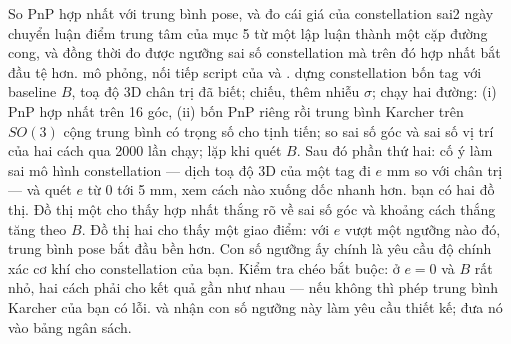 \documentclass[../../marker.tex]{subfiles}
\begin{document}
\begin{duan}{So PnP hợp nhất với trung bình pose, và đo cái giá của constellation sai}{2 ngày}
\dmt chuyển luận điểm trung tâm của mục 5 từ một lập luận thành một cặp đường cong, và đồng thời đo được ngưỡng sai số constellation mà trên đó hợp nhất bắt đầu tệ hơn.
\ddl mô phỏng, nối tiếp script của  và .
\dbc dựng constellation bốn tag với baseline \(B\), toạ độ 3D chân trị đã biết; chiếu, thêm nhiễu \(\sigma\); chạy hai đường: (i) PnP hợp nhất trên 16 góc, (ii) bốn PnP riêng rồi trung bình Karcher trên \(SO(3)\) cộng trung bình có trọng số cho tịnh tiến; so sai số góc và sai số vị trí của hai cách qua 2000 lần chạy; lặp khi quét \(B\). Sau đó phần thứ hai: cố ý làm sai mô hình constellation --- dịch toạ độ 3D của một tag đi \(e\) mm so với chân trị --- và quét \(e\) từ 0 tới 5 mm, xem cách nào xuống dốc nhanh hơn.
\dxk bạn có hai đồ thị. Đồ thị một cho thấy hợp nhất thắng rõ về sai số góc và khoảng cách thắng tăng theo \(B\). Đồ thị hai cho thấy một giao điểm: với \(e\) vượt một ngưỡng nào đó, trung bình pose bắt đầu bền hơn. Con số ngưỡng ấy chính là yêu cầu độ chính xác cơ khí cho constellation của bạn. Kiểm tra chéo bắt buộc: ở \(e = 0\) và \(B\) rất nhỏ, hai cách phải cho kết quả gần như nhau --- nếu không thì phép trung bình Karcher của bạn có lỗi.
\dnv {} và  nhận con số ngưỡng này làm yêu cầu thiết kế;  đưa nó vào bảng ngân sách.
\end{duan}
\end{document}
